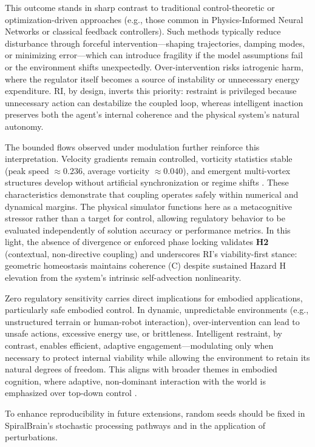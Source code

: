 \documentclass[12pt,a4paper]{article}
\begin{document}
This outcome stands in sharp contrast to traditional control-theoretic or optimization-driven approaches (e.g., those common in Physics-Informed Neural Networks or classical feedback controllers). Such methods typically reduce disturbance through forceful intervention—shaping trajectories, damping modes, or minimizing error—which can introduce fragility if the model assumptions fail or the environment shifts unexpectedly. Over-intervention risks iatrogenic harm, where the regulator itself becomes a source of instability or unnecessary energy expenditure. RI, by design, inverts this priority: restraint is privileged because unnecessary action can destabilize the coupled loop, whereas intelligent inaction preserves both the agent's internal coherence and the physical system's natural autonomy.

The bounded flows observed under modulation further reinforce this interpretation. Velocity gradients remain controlled, vorticity statistics stable (peak speed $\approx 0.236$, average vorticity $\approx 0.040$), and emergent multi-vortex structures develop without artificial synchronization or regime shifts \cite{Pope2000}. These characteristics demonstrate that coupling operates safely within numerical and dynamical margins. The physical simulator functions here as a metacognitive stressor rather than a target for control, allowing regulatory behavior to be evaluated independently of solution accuracy or performance metrics. In this light, the absence of divergence or enforced phase locking validates \textbf{H2} (contextual, non-directive coupling) and underscores RI's viability-first stance: geometric homeostasis maintains coherence (C) despite sustained Hazard H elevation from the system's intrinsic self-advection nonlinearity.

Zero regulatory sensitivity carries direct implications for embodied applications, particularly safe embodied control. In dynamic, unpredictable environments (e.g., unstructured terrain or human-robot interaction), over-intervention can lead to unsafe actions, excessive energy use, or brittleness. Intelligent restraint, by contrast, enables efficient, adaptive engagement—modulating only when necessary to protect internal viability while allowing the environment to retain its natural degrees of freedom. This aligns with broader themes in embodied cognition, where adaptive, non-dominant interaction with the world is emphasized over top-down control \cite{Friston2010}.

To enhance reproducibility in future extensions, random seeds should be fixed in SpiralBrain's stochastic processing pathways and in the application of perturbations.
\end{document}
